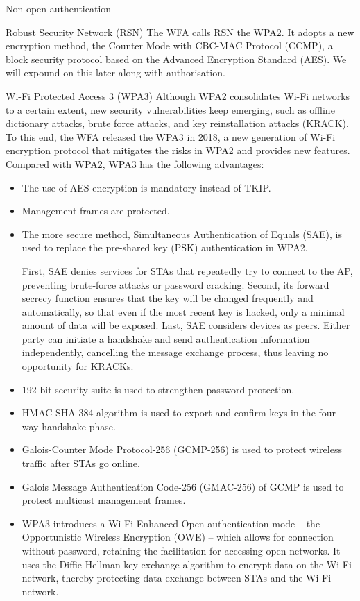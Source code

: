 \documentclass[a4paper,12pt]{book}
\begin{document}
\begin{term}{Non-open authentication}
    \begin{secterm}{Robust Security Network (RSN)}
        The WFA calls RSN the WPA2. It adopts a new encryption method, the Counter Mode with CBC-MAC Protocol (CCMP), a block security protocol based on the Advanced Encryption Standard (AES). We will expound on this later along with authorisation.
    \end{secterm}

    \begin{secterm}{Wi-Fi Protected Access 3 (WPA3)}
        Although WPA2 consolidates Wi-Fi networks to a certain extent, new security vulnerabilities keep emerging, such as offline dictionary attacks, brute force attacks, and key reinstallation attacks (KRACK). To this end, the WFA released the WPA3 in 2018, a new generation of Wi-Fi encryption protocol that mitigates the risks in WPA2 and provides new features. Compared with WPA2, WPA3 has the following advantages:

        \parskip 6pt
        \begin{itemize}
            \item The use of AES encryption is mandatory instead of TKIP.
            \item Management frames are protected.
            \item The more secure method, Simultaneous Authentication of Equals (SAE), is used to replace the pre-shared key (PSK) authentication in WPA2.
            
            First, SAE denies services for STAs that repeatedly try to connect to the AP, preventing brute-force attacks or password cracking. Second, its forward secrecy function ensures that the key will be changed frequently and automatically, so that even if the most recent key is hacked, only a minimal amount of data will be exposed. Last, SAE considers devices as peers. Either party can initiate a handshake and send authentication information independently, cancelling the message exchange process, thus leaving no opportunity for KRACKs.
            \item 192-bit security suite is used to strengthen password protection.
            \item HMAC-SHA-384 algorithm is used to export and confirm keys in the four-way handshake phase.
            \item Galois-Counter Mode Protocol-256 (GCMP-256) is used to protect wireless traffic after STAs go online.
            \item Galois Message Authentication Code-256 (GMAC-256) of GCMP is used to protect multicast management frames.
            \item WPA3 introduces a Wi-Fi Enhanced Open authentication mode – the Opportunistic Wireless Encryption (OWE) – which allows for connection without password, retaining the facilitation for accessing open networks. It uses the Diffie-Hellman key exchange algorithm to encrypt data on the Wi-Fi network, thereby protecting data exchange between STAs and the Wi-Fi network.
        \end{itemize}
    \end{secterm}
\end{term}
\end{document}
